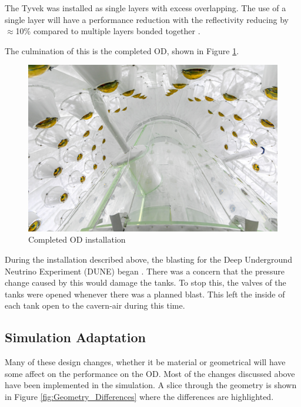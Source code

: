 \par
The Tyvek was installed as single layers with excess overlapping.
The use of a single layer will have a performance reduction with the reflectivity reducing by $\approx$10\% compared to multiple layers bonded together \cite{tyvek_reflectivity_ref}.

\par
The culmination of this is the completed OD, shown in Figure \ref{fig:complete_od}.

\begin{figure}[!htbp]
\includegraphics[width=\textwidth]{Figures/Construction/od_complete.jpg}
\centering
\caption{Completed OD installation}
\label{fig:complete_od}
\end{figure}

\par
During the installation described above, the blasting for the Deep Underground Neutrino Experiment (DUNE) began \cite{dune_blasting_ref}.
There was a concern that the pressure change caused by this would damage the tanks.
To stop this, the valves of the tanks were opened whenever there was a planned blast.
This left the inside of each tank open to the cavern-air during this time.

\subsection{Simulation Adaptation}
\par
Many of these design changes, whether it be material or geometrical will have some affect on the performance on the OD.
Most of the changes discussed above have been implemented in the simulation.
A slice through the geometry is shown in Figure \ref{fig:Geometry_Differences} where the differences are highlighted.

